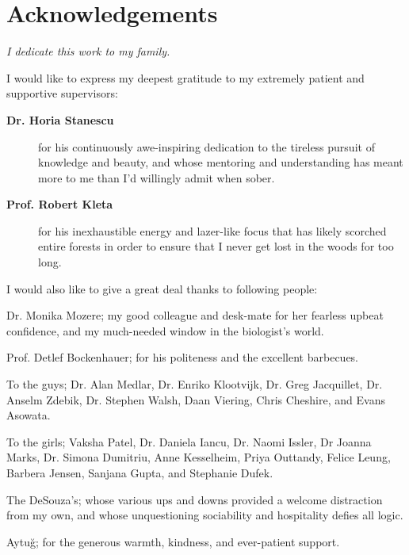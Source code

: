 \chapter*{Acknowledgements}
\vfill
\emph{\large I dedicate this work to my family.}

\vfill

\noindent
I would like to express my deepest gratitude to my extremely patient and supportive supervisors:
\vspace{-5pt}
\begin{description}
\item[\bf Dr. Horia Stanescu]{for his continuously awe-inspiring dedication to the tireless pursuit of knowledge and beauty, and whose mentoring and understanding has meant more to me than I'd willingly admit when sober.}
\item[\bf Prof. Robert Kleta]{for his inexhaustible energy and lazer-like focus that has likely scorched entire forests in order to ensure that I never get lost in the woods for too long.}
\end{description}

\vfill

\noindent


\begin{spacing}{1.3}
\noindent
I would also like to give a great deal thanks to following people:
\vspace{-8pt}
\begin{description}
\item{{Dr. Monika Mozere;} my good colleague and desk-mate for her fearless upbeat confidence, and my much-needed window in the biologist's world.}
\item{{Prof. Detlef Bockenhauer;} for his politeness and the excellent barbecues.}
\item{{To the guys;} Dr. Alan Medlar, Dr. Enriko Klootvijk, Dr. Greg Jacquillet, Dr. Anselm Zdebik, Dr. Stephen Walsh, Daan Viering, Chris Cheshire, and Evans Asowata.}
\item{{To the girls;} Vaksha Patel, Dr. Daniela Iancu, Dr. Naomi Issler, Dr Joanna Marks, Dr. Simona Dumitriu, Anne Kesselheim, Priya Outtandy, Felice Leung, Barbera Jensen, Sanjana Gupta, and Stephanie Dufek.}
\item{{The DeSouza's;} whose various ups and downs provided a welcome distraction from my own, and whose unquestioning sociability and hospitality defies all logic.} 
\item{{Aytu\u{g};} for the generous warmth, kindness, and ever-patient support.}
\end{description}
\end{spacing}